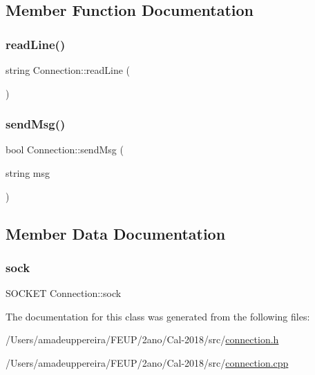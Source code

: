 \subsection{Member Function Documentation}
\mbox{\label{class_connection_a1df16b436751b686d96c24ca0c498659}} 
\subsubsection{\texorpdfstring{read\+Line()}{readLine()}}
{\footnotesize\ttfamily string Connection\+::read\+Line (\begin{DoxyParamCaption}{ }\end{DoxyParamCaption})}

\mbox{\label{class_connection_a4b9f6db1fb42fc9857f829fa0bc52e6e}} 
\subsubsection{\texorpdfstring{send\+Msg()}{sendMsg()}}
{\footnotesize\ttfamily bool Connection\+::send\+Msg (\begin{DoxyParamCaption}\item[{string}]{msg }\end{DoxyParamCaption})}



\subsection{Member Data Documentation}
\mbox{\label{class_connection_a50ca7c17a64836ca25a1fe9953cc6cf6}} 
\subsubsection{\texorpdfstring{sock}{sock}}
{\footnotesize\ttfamily S\+O\+C\+K\+ET Connection\+::sock\hspace{0.3cm}{\ttfamily [private]}}



The documentation for this class was generated from the following files\+:\begin{DoxyCompactItemize}
\item 
/\+Users/amadeuppereira/\+F\+E\+U\+P/2ano/\+Cal-\/2018/src/\mbox{\hyperlink{connection_8h}{connection.\+h}}\item 
/\+Users/amadeuppereira/\+F\+E\+U\+P/2ano/\+Cal-\/2018/src/\mbox{\hyperlink{connection_8cpp}{connection.\+cpp}}\end{DoxyCompactItemize}
